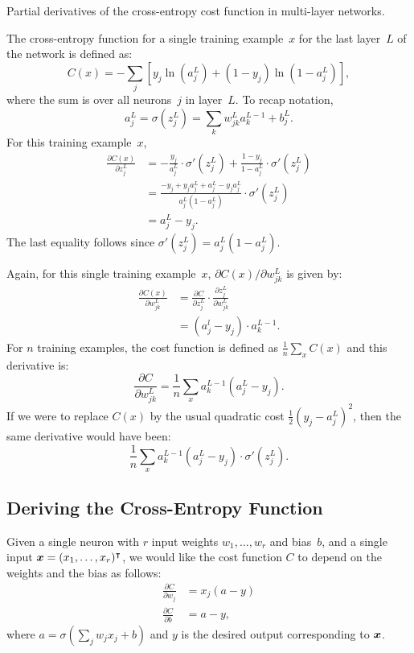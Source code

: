 \begin{exercise}
Partial derivatives of the cross-entropy cost function in multi-layer
networks.
\end{exercise}
\begin{solution}
The cross-entropy function for a single training example~$x$ for the last
layer~$L$ of the network is defined as:
\[
    C(x) = - \sum_j \left [ y_j \ln (a_j^L) + (1 - y_j) \ln(1 - a_j^L) \right ],
\]
where the sum is over all neurons~$j$ in layer~$L$. To recap notation,  
\[
a_j^L = \sigma(z_j^L) = \sum_k w_{j k}^L a_k^{L - 1} + b_j^L.
\]
For this training example~$x$,
\begin{align*}
    \frac{\partial C(x)}{\partial z_j^L} 
        & = - \frac{y_j}{a_j^L} \cdot \sigma' (z_j^L) + \frac{1 - y_j}{1 - a_j^L} \cdot \sigma' (z_j^L) \\
        & = \frac{-y_j + y_j a_j^L + a_j^L - y_j a_j^L}{a_j^L (1 - a_j^L)} \cdot \sigma' (z_j^L) \\
        & = a_j^L - y_j.
\end{align*}
The last equality follows since $\sigma' (z_j^L) = a_j^L (1 - a_j^L)$.

Again, for this single training example~$x$, $\partial C (x) / \partial w_{j k}^L$ 
is given by:
\begin{align*}
    \frac{\partial C (x)}{\partial w_{j k}^L} 
        & = \frac{\partial C}{\partial z_j^L} \cdot \frac{\partial z_j^L}{\partial w_{j k}^L} \\
        & = (a_j^l - y_j) \cdot a_k^{L - 1}. 
\end{align*}
For $n$ training examples, the cost function is defined as $\frac{1}{n} \sum_{x} C(x)$ and 
this derivative is: 
\[
    \frac{\partial C}{\partial w_{j k}^L} = \frac{1}{n} \sum_x a_k^{L - 1} (a_j^L - y_j).
\]
If we were to replace $C(x)$ by the usual quadratic cost $\frac{1}{2}(y_j - a_j^L)^2$, then 
the same derivative would have been:
\[
    \frac{1}{n} \sum_x a_k^{L - 1} (a_j^L - y_j) \cdot \sigma' (z_j^L).
\]
\end{solution}

\subsection{Deriving the Cross-Entropy Function}

Given a single neuron with $r$ input weights $w_1, \ldots, w_r$ and bias~$b$,
and a single input $\boldsymbol{x} = (x_1, \ldots, x_r)^{\intercal}$, we would like the
cost function $C$ to depend on the weights and the bias as follows:
\begin{align}
    \frac{\partial C}{\partial w_j} & = x_j (a - y) \\
    \frac{\partial C}{\partial b}   & = a - y, \label{eqn:cost_bias}
\end{align}
where $a = \sigma(\sum_{j} w_j x_j + b)$ and $y$ is the desired output 
corresponding to $\boldsymbol{x}$. 


